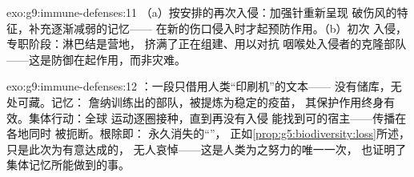 \begin{solution}{exo:g9:immune-defenses:11}
（a）按安排的再次入侵：加强针重新呈现
破伤风的特征，补充逐渐减弱的记忆——
在新的伤口侵入时才起预防作用。（b）初次
入侵，专职阶段：淋巴结是营地，
挤满了正在组建、用以对抗
咽喉处入侵者的克隆部队——这是防御在起作用，而非灾难。
\end{solution}

\begin{solution}{exo:g9:immune-defenses:12}
：一段只借用人类“印刷机”的文本——
没有储库，无处可藏。记忆：
詹纳训练出的部队，被提炼为稳定的疫苗，
其保护作用终身有效。集体行动：全球
运动逐圈接种，直到再没有入侵
能找到可的宿主——传播在各地同时
被扼断。根除即：
永久消失的“”，
正如\cref{prop:g5:biodiversity:loss}所述，只是此次为有意达成的，
无人哀悼——这是人类为之努力的唯一一次，
也证明了集体记忆所能做到的事。
\end{solution}

